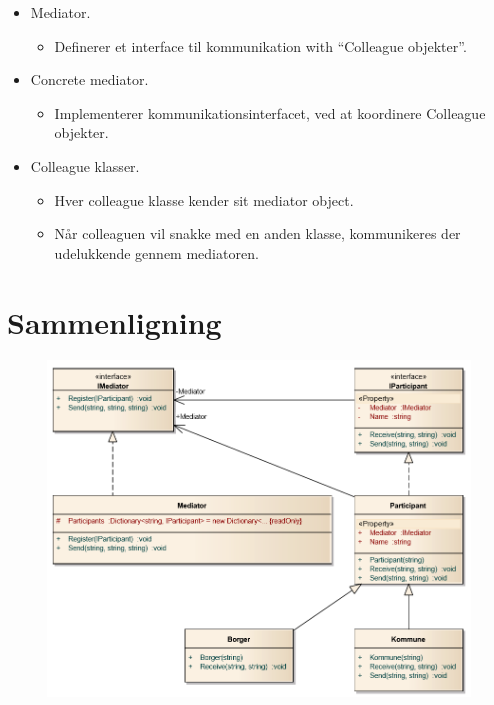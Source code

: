 \begin{itemize}
	\item Mediator.
	\begin{itemize}
		\item 	Definerer et interface til kommunikation with “Colleague objekter”.
	\end{itemize}
	\item Concrete mediator.
	\begin{itemize}
		\item 	Implementerer kommunikationsinterfacet, ved at koordinere Colleague objekter.
	\end{itemize}
	\item Colleague klasser.
	\begin{itemize}
		\item Hver colleague klasse kender sit mediator object.
		\item Når colleaguen vil snakke med en anden klasse, kommunikeres der udelukkende gennem mediatoren.
	\end{itemize}
\end{itemize}

\section{Sammenligning}

\begin{figure}[h]
	\centering
	\includegraphics[width=\linewidth]{figs/classdiagram}
	\caption{}
	\label{fig:mediclass}
\end{figure}

